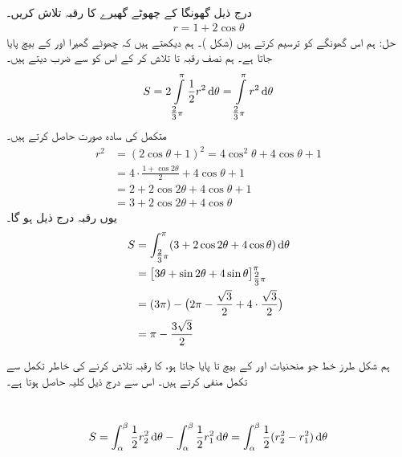 درج ذیل گھونگا کے چھوٹے گھیرے کا رقبہ تلاش کریں۔
\begin{align*}
r=1+2\cos\theta
\end{align*}
حل:\quad
ہم اس گھونگے کو ترسیم کرتے ہیں (شکل )۔ ہم دیکھتے ہیں کہ چھوٹے گھیرا  اور  کے بیچ پایا جاتا ہے۔ ہم نصف رقبہ   تا  تلاش کر کے  اس کو  سے ضرب دیتے ہیں۔
\begin{align*}
S=2\int\limits_{\tfrac{2}{3}\pi}^{\pi}\frac{1}{2}r^2\dif\theta=\int\limits_{\tfrac{2}{3}\pi}^{\pi}r^2\dif \theta
\end{align*}
متکمل  کی سادہ صورت حاصل کرتے ہیں۔ 
\begin{align*}
r^2&=(2\cos\theta+1)^2=4\cos^2\theta+4\cos\theta+1\\
&=4\cdot\frac{1+\cos2\theta}{2}+4\cos\theta+1\\
&=2+2\cos2\theta+4\cos\theta+1\\
&=3+2\cos2\theta+4\cos\theta
\end{align*}
یوں رقبہ درج ذیل ہو گا۔
\begin{align*}
S&=\int_{\tfrac{2}{3}\pi}^{\pi} (3+2\cos2\theta+4\cos\theta)\dif \theta\\
&=\big[3\theta+\sin2\theta+4\sin\theta\big]_{\tfrac{2}{3}\pi}^{\pi}\\
&=(3\pi)-\big(2\pi-\frac{\sqrt{3}}{2}+4\cdot\frac{\sqrt{3}}{2}\big)\\
&=\pi-\frac{3\sqrt{3}}{2}
\end{align*}

ہم شکل  طرز خط جو منحنیات  اور  کے بیچ  تا   پایا جاتا ہو، کا رقبہ تلاش کرنے کی خاطر تکمل  سے تکمل  منفی کرتے ہیں۔ اس سے درج ذیل کلیہ حاصل ہوتا ہے۔

\\
\begin{align}\label{مساوات_مخروط_رقبہ_قطبی_رداس_کے_بیچ}
S=\int_{\alpha}^{\beta}\frac{1}{2}r_2^2\dif\theta-\int_{\alpha}^{\beta}\frac{1}{2}r_1^2\dif\theta=\int_{\alpha}^{\beta}\frac{1}{2}(r_2^2-r_1^2)\dif\theta
\end{align}

